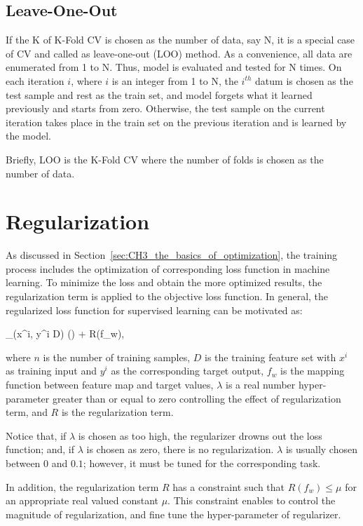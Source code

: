 \subsection{Leave-One-Out}

If the K of K-Fold CV is chosen as the number of data, say N, it is a special case of CV and called as leave-one-out (LOO) method. As a convenience, all data are enumerated from 1 to N. Thus, model is evaluated and tested for N times. On each iteration $i$, where $i$ is an integer from 1 to N, the $i^{th}$ datum is chosen as the test sample and rest as the train set, and model forgets what it learned previously and starts from zero. Otherwise, the test sample on the current iteration takes place in the train set on the previous iteration and is learned by the model.

Briefly, LOO is the K-Fold CV where the number of folds is chosen as the number of data.

\section{Regularization}
\label{sec:CH5_regularization}

As discussed in Section~\ref{sec:CH3_the_basics_of_optimization}, the training process includes the optimization of corresponding loss function in machine learning. To minimize the loss and obtain the more optimized results, the regularization term is applied to the objective loss function. In general, the regularized loss function for supervised learning can be motivated as:

\be
\label{eq:general_regularized_loss}
\sum_{(x^{i}, y^{i} \in D)} \Big(\Big) + \lambda R(f_{w}), 
\ee

where $n$ is the number of training samples, $D$ is the training feature set with $x^{i}$ as training input and $y^{i}$ as the corresponding target output, $f_{w}$ is the mapping function between feature map and target values, $\lambda$ is a real number hyper-parameter greater than or equal to zero controlling the effect of regularization term, and $R$ is the regularization term. 

Notice that, if $\lambda$ is chosen as too high, the regularizer drowns out the loss function; and, if $\lambda$ is chosen as zero, there is no regularization. $\lambda$ is usually chosen between $0$ and $0.1$; however, it must be tuned for the corresponding task.

In addition, the regularization term $R$ has a constraint such that $R(f_{w}) \leq \textbf{$\mu$}$ for an appropriate real valued constant $\textbf{$\mu$}$. This constraint enables to control the magnitude of regularization, and fine tune the hyper-parameter of regularizer.

